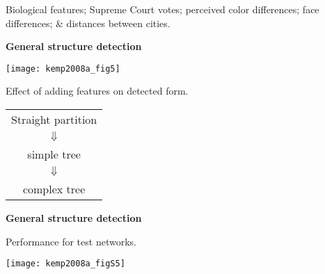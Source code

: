   
   
    \small
    Biological features; 
    Supreme Court votes; 
    perceived color differences; 
    face differences; 
    \& distances between cities.
  


  \textbf{General structure detection}
  
      
    \texttt{[image: kemp2008a\_fig5]}
    
    
     
      Effect of adding features on detected form.
      \bigskip
      {
        \begin{tabular}{c}
          \alert{Straight partition} \\
          $\Downarrow$ \\
          \alert{simple tree} \\
          $\Downarrow$ \\
          \alert{complex tree}
        \end{tabular}
      }
    
  

  \textbf{General structure detection}

  
  
    Performance for test networks.
  
  
  \texttt{[image: kemp2008a\_figS5]}




